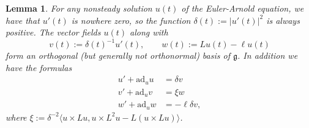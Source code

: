 \documentclass[oneside, 11pt]{amsart}
\newtheorem{lemma}[theorem]{Lemma}
\numberwithin{equation}{section}
\newcommand{\ad}{\mathrm{ad}}
\begin{document}
\begin{lemma}\label{orthogonallemma}
For any nonsteady solution $u(t)$ of the Euler-Arnold equation, we have that $u'(t)$ is nowhere zero, so the function $\delta(t):=\lvert u'(t)\rvert^2$ is always positive.  The vector fields $u(t)$ along with
$$ v(t) := \delta(t)^{-1} u'(t), \qquad w(t) := Lu(t) - \ell u(t)$$
form an orthogonal (but generally not orthonormal) basis of $\mathfrak{g}$. 
In addition we have the formulas 
\begin{align}
u' + \ad_uu &= \delta  v \label{utadu}\\
v' + \ad_uv &= \xi w \label{vtadv}\\
w' + \ad_uw &= -\ell \delta v,\label{wtadw}
\end{align}
where $\xi := \delta^{-2} \langle u\times Lu, u\times L^2u - L(u\times Lu)\rangle$. 
\end{lemma} 
\end{document}
